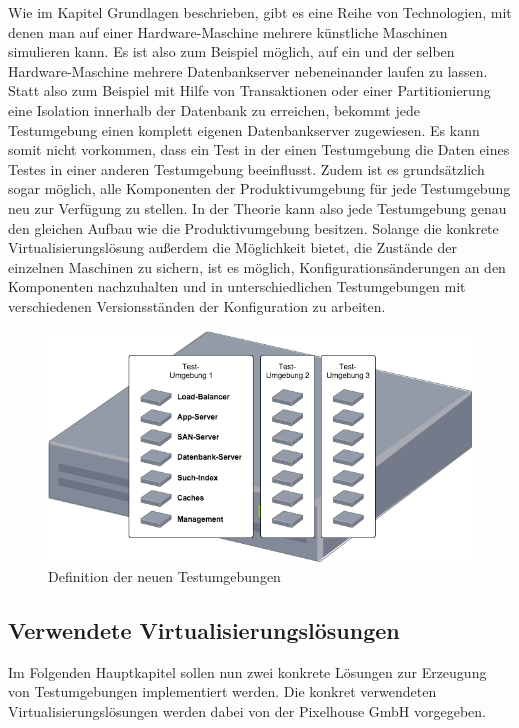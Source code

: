 Wie im Kapitel Grundlagen beschrieben, gibt es eine Reihe von Technologien, mit denen man auf einer Hardware-Maschine mehrere künstliche Maschinen simulieren kann. Es ist also zum Beispiel möglich, auf ein und der selben Hardware-Maschine mehrere Datenbankserver nebeneinander laufen zu lassen. Statt also zum Beispiel mit Hilfe von Transaktionen oder einer Partitionierung eine Isolation innerhalb der Datenbank zu erreichen, bekommt jede Testumgebung einen komplett eigenen Datenbankserver zugewiesen. Es kann somit nicht vorkommen, dass ein Test in der einen Testumgebung die Daten eines Testes in einer anderen Testumgebung beeinflusst. Zudem ist es grundsätzlich sogar möglich, alle Komponenten der Produktivumgebung für jede Testumgebung neu zur Verfügung zu stellen. In der Theorie kann also jede Testumgebung genau den gleichen Aufbau wie die Produktivumgebung besitzen. Solange die konkrete Virtualisierungslösung außerdem die Möglichkeit bietet, die Zustände der einzelnen Maschinen zu sichern, ist es möglich, Konfigurationsänderungen an den Komponenten nachzuhalten und in unterschiedlichen Testumgebungen mit verschiedenen Versionsständen der Konfiguration zu arbeiten. 

\begin{figure}[!ht]
  \begin{center}
    \includegraphics[width=14cm]{bilder/Untersuchungs-Umgebung.png}
    \caption{Definition der neuen Testumgebungen}
  \end{center}
\end{figure}

\subsection{Verwendete Virtualisierungslösungen}

Im Folgenden Hauptkapitel sollen nun zwei konkrete Lösungen zur Erzeugung von Testumgebungen implementiert werden. Die konkret verwendeten Virtualisierungslösungen werden dabei von der Pixelhouse GmbH vorgegeben.

